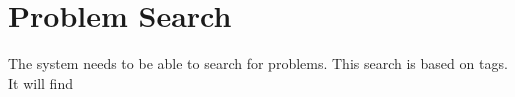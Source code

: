 \section{Problem Search}
The system needs to be able to search for problems. This search is based on tags. It will find 